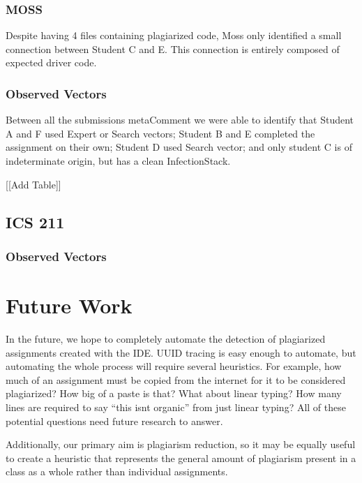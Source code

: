 \documentclass[12pt,final,thesis,actual]{uhthesis}
\newcommand{\n}{\hfill\break}
\newcommand{\metaComment}{metaComment\xspace}
\newcommand{\infectionStack}{InfectionStack\xspace}
\begin{document}
\n\subsection{\textbf{MOSS}}
Despite having 4 files containing plagiarized code, Moss only identified a small connection between Student C and E.  This connection is entirely composed of expected driver code. 
\n\subsection{\textbf{Observed Vectors}}
Between all the submissions \metaComment we were able to identify that Student A and F used Expert or Search vectors; Student B and E completed the assignment on their own; Student D used Search vector; and only student C is of indeterminate origin, but has a clean \infectionStack.

[[Add Table]]
\section{\textbf{ICS 211}}

\n\subsection{\textbf{Observed Vectors}}

\n\chapter{\textbf{Future Work}}
In the future, we hope to completely automate the detection of plagiarized assignments created with the IDE.  UUID tracing is easy enough to automate, but automating the whole process will require several heuristics.  For example, how much of an assignment must be copied from the internet for it to be considered plagiarized?  How big of a paste is that?  What about linear typing?  How many lines are required to say ``this isnt organic'' from just linear typing?  All of these potential questions need future research to answer.  

Additionally, our primary aim is plagiarism reduction, so it may be equally useful to create a heuristic that represents the general amount of plagiarism present in a class as a whole rather than individual assignments. 
\end{document}
